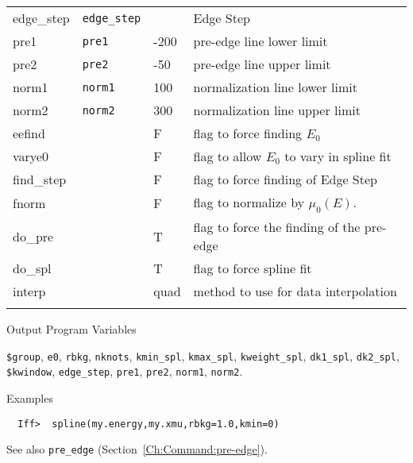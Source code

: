 \begin{IFFcom}
\begin{tabular}{llll}
    {edge\_step} & {\tt{edge\_step}} &  & {Edge Step} \\ 
    {pre1} & {\tt{pre1}} &{-200} & {pre-edge line lower limit} \\ 
    {pre2} & {\tt{pre2}} &{-50}  & {pre-edge line upper limit} \\ 
    {norm1} & {\tt{norm1}} &{100}  & {normalization line lower limit} \\ 
    {norm2} & {\tt{norm2}} &{300} & {normalization line upper limit} \\ 
    {eefind}     & &{F} & {flag to force finding $E_0$} \\ 
    {varye0}     & &{F} & flag to allow $E_0$ to vary in spline fit\\ 
    {find\_step} & &{F} & flag to force finding of Edge Step \\ 
    {fnorm}      & &{F} & flag to normalize by $\mu_0(E)$.\\ 
    {do\_pre}    & &{T} & flag to force the finding of the pre-edge \\ 
    {do\_spl}    & &{T} & flag to force spline fit \\ 
    {interp}    &   &{quad}  & {method to use for data interpolation} \\ 
    \noalign{\smallskip}
  \end{tabular}
  \noindent
  
\item[Output Program Variables] 
  \begin{sloppypar}
    {\tt{\$group}}, {\tt{e0}}, {\tt{rbkg}}, {\tt{nknots}},
    {\tt{kmin\_spl}}, {\tt{kmax\_spl}}, {\tt{kweight\_spl}},
    {\tt{dk1\_spl}}, {\tt{dk2\_spl}}, {\tt{\$kwindow}}, {\tt{edge\_step}},
    {\tt{pre1}}, {\tt{pre2}}, {\tt{norm1}}, {\tt{norm2}}.
  \end{sloppypar}  
\item[Examples] {\hspace{1.in} \vspace{-0.1truein} \relax}
\begin{verbatim} 
  Iff>  spline(my.energy,my.xmu,rbkg=1.0,kmin=0)
\end{verbatim} \noindent %
\item[See also] 
{\texttt{pre\_edge}} (Section~\ref{Ch:Command:pre-edge}).
\end{IFFcom}



